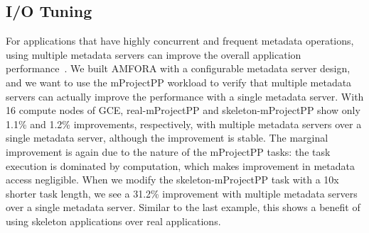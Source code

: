 \documentclass[preprint,12pt]{elsarticle}
\begin{document}
\subsection{I/O Tuning}
For applications that have highly concurrent and frequent metadata operations, using multiple metadata servers can improve the overall application performance~\cite{GIGA+, PVFS2009}.
We built AMFORA with a configurable metadata server design, and we want to use the mProjectPP workload to verify that multiple metadata servers can actually improve
the performance with a single metadata server.
With 16 compute nodes of GCE,  real-mProjectPP and skeleton-mProjectPP show only  1.1\% and 1.2\% improvements, respectively,  with multiple metadata servers over a single metadata server, although
the improvement is stable. 
The marginal improvement is again due to the nature of the mProjectPP tasks: the task execution is dominated by computation, which makes  improvement in metadata access negligible.
When we modify the skeleton-mProjectPP task with a 10x shorter task length, we see a 31.2\% improvement with multiple metadata servers over a single metadata server.  Similar to the last example, this shows a benefit of using skeleton applications over real applications.
\end{document}
